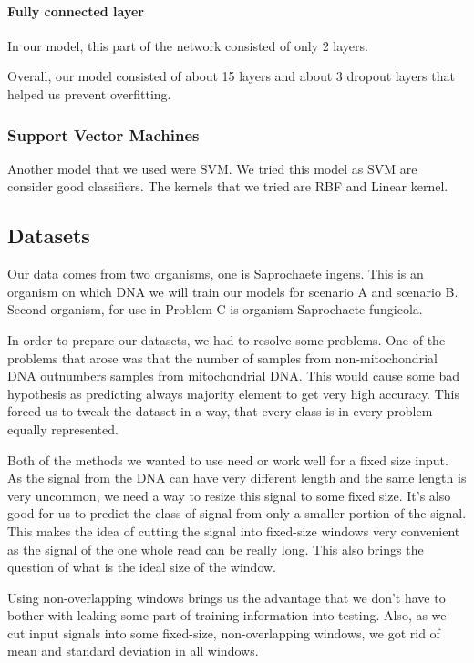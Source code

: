 \paragraph{Fully connected layer}

In our model, this part of the network consisted of only 2 layers.

Overall, our model consisted of about 15 layers and about 3 dropout layers that
helped us prevent overfitting.

\subsubsection{Support Vector Machines}

Another model that we used were SVM. We tried this model as SVM are consider good
classifiers. The kernels that we tried are RBF and Linear kernel.

\subsection{Datasets}

Our data comes from two organisms, one is Saprochaete ingens. This is an organism
on which DNA we will train our models for scenario A and scenario B. Second organism,
for use in Problem C is organism Saprochaete fungicola.

In order to prepare our datasets, we had to resolve some problems. One of the
problems that arose was that the number of samples from non-mitochondrial DNA
outnumbers samples from mitochondrial DNA. This would cause some bad hypothesis
as predicting always majority element to get very high accuracy. This forced us
to tweak the dataset in a way, that every class is in every problem equally represented.

Both of the methods we wanted to use need or work well for a fixed size input.
As the signal from the DNA can have very different length and the same length is
very uncommon, we need a way to resize this signal to some fixed size. It’s also
good for us to predict the class of signal from only a smaller portion of the signal.
This makes the idea of cutting the signal into fixed-size windows very convenient
as the signal of the one whole read can be really long. This also brings the question
of what is the ideal size of the window.

Using non-overlapping windows brings us the advantage that we don't have to bother
with leaking some part of training information into testing. Also, as we cut input
signals into some fixed-size, non-overlapping windows, we got rid of mean and
standard deviation in all windows.

